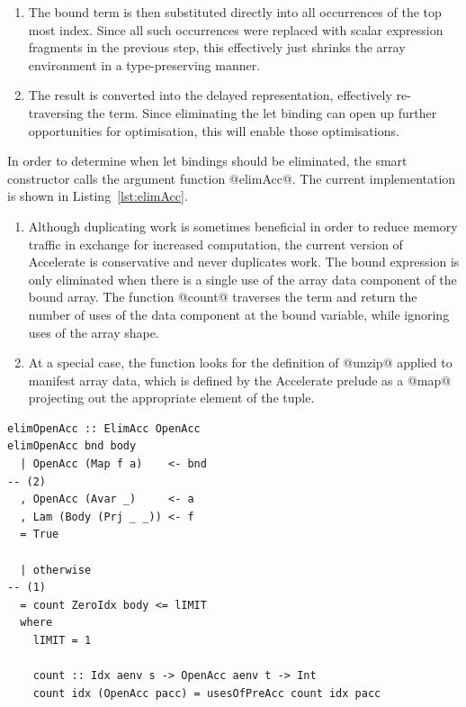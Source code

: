 \begin{enumerate}
\item The bound term is then substituted directly into all occurrences of the
    top most index. Since all such occurrences were replaced with scalar
    expression fragments in the previous step, this effectively just shrinks the
    array environment in a type-preserving manner.

\item The result is converted into the delayed representation, effectively
    re-traversing the term. Since eliminating the let binding can open up
    further opportunities for optimisation, this will enable those
    optimisations.


\end{enumerate}

In order to determine when let bindings should be eliminated, the smart
constructor calls the argument function @elimAcc@. The current implementation is
shown in Listing~\ref{lst:elimAcc}.

\begin{enumerate}
\item Although duplicating work is sometimes beneficial in order to reduce
    memory traffic in exchange for increased computation, the current version of
    Accelerate is conservative and never duplicates work. The bound expression
    is only eliminated when there is a single use of the array data component of
    the bound array. The function @count@ traverses the term and return the
    number of uses of the data component at the bound variable, while ignoring
    uses of the array shape.

\item At a special case, the function looks for the definition of @unzip@
    applied to manifest array data, which is defined by the Accelerate prelude
    as a @map@ projecting out the appropriate element of the tuple.

\end{enumerate}

\begin{lstlisting}[style=haskell_float
    ,label=lst:elimAcc
    ,caption={Determining when a let binding should be eliminated}]
elimOpenAcc :: ElimAcc OpenAcc
elimOpenAcc bnd body
  | OpenAcc (Map f a)    <- bnd                                                        -- (2)
  , OpenAcc (Avar _)     <- a
  , Lam (Body (Prj _ _)) <- f
  = True

  | otherwise                                                                          -- (1)
  = count ZeroIdx body <= lIMIT
  where
    lIMIT = 1

    count :: Idx aenv s -> OpenAcc aenv t -> Int
    count idx (OpenAcc pacc) = usesOfPreAcc count idx pacc
\end{lstlisting}

